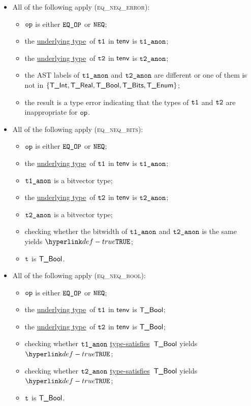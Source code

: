 \documentclass{book}
\newcommand\ProseOrTypeError[0]{\ProseTerminateAs{\TypeErrorConfig}}
\newcommand\underlyingtype[0]{\hyperlink{def-underlyingtype}{underlying type}}
\newcommand\typesatisfies[0]{\hyperlink{def-typesatisfies}{type-satisfies}}
\begin{document}
\begin{itemize}
  \item All of the following apply (\textsc{eq\_neq\_error}):
  \begin{itemize}
    \item $\texttt{op}$ is either $\texttt{EQ\_OP}$ or $\texttt{NEQ}$;
    \item the \underlyingtype\ of $\texttt{t1}$ in $\textsf{tenv}$ is $\texttt{t1\_anon}$\ProseOrTypeError;
    \item the \underlyingtype\ of $\texttt{t2}$ in $\textsf{tenv}$ is $\texttt{t2\_anon}$\ProseOrTypeError;
    \item the AST labels of $\texttt{t1\_anon}$ and $\texttt{t2\_anon}$ are different or one of them is not in
          $\{\textsf{T\_Int}, \textsf{T\_Real}, \textsf{T\_Bool}, \textsf{T\_Bits}, \textsf{T\_Enum}\}$;
    \item the result is a type error indicating that the types of $\texttt{t1}$ and $\texttt{t2}$ are inappropriate for $\texttt{op}$.
  \end{itemize}

  \item All of the following apply (\textsc{eq\_neq\_bits}):
  \begin{itemize}
    \item $\texttt{op}$ is either $\texttt{EQ\_OP}$ or $\texttt{NEQ}$;
    \item the \underlyingtype\ of $\texttt{t1}$ in $\textsf{tenv}$ is $\texttt{t1\_anon}$\ProseOrTypeError;
    \item $\texttt{t1\_anon}$ is a bitvector type;
    \item the \underlyingtype\ of $\texttt{t2}$ in $\textsf{tenv}$ is $\texttt{t2\_anon}$\ProseOrTypeError;
    \item $\texttt{t2\_anon}$ is a bitvector type;
    \item checking whether the bitwidth of $\texttt{t1\_anon}$ and $\texttt{t2\_anon}$ is the same yields $\True$\ProseOrTypeError;
    \item $\texttt{t}$ is $\textsf{T\_Bool}$.
  \end{itemize}

  \item All of the following apply (\textsc{eq\_neq\_bool}):
  \begin{itemize}
    \item $\texttt{op}$ is either $\texttt{EQ\_OP}$ or $\texttt{NEQ}$;
    \item the \underlyingtype\ of $\texttt{t1}$ in $\textsf{tenv}$ is $\textsf{T\_Bool}$\ProseOrTypeError;
    \item the \underlyingtype\ of $\texttt{t2}$ in $\textsf{tenv}$ is $\textsf{T\_Bool}$\ProseOrTypeError;
    \item checking whether $\texttt{t1\_anon}$ \typesatisfies\ $\textsf{T\_Bool}$ yields $\True$\ProseOrTypeError;
    \item checking whether $\texttt{t2\_anon}$ \typesatisfies\ $\textsf{T\_Bool}$ yields $\True$\ProseOrTypeError;
    \item $\texttt{t}$ is $\textsf{T\_Bool}$.
  \end{itemize}


\end{itemize}
\end{document}
